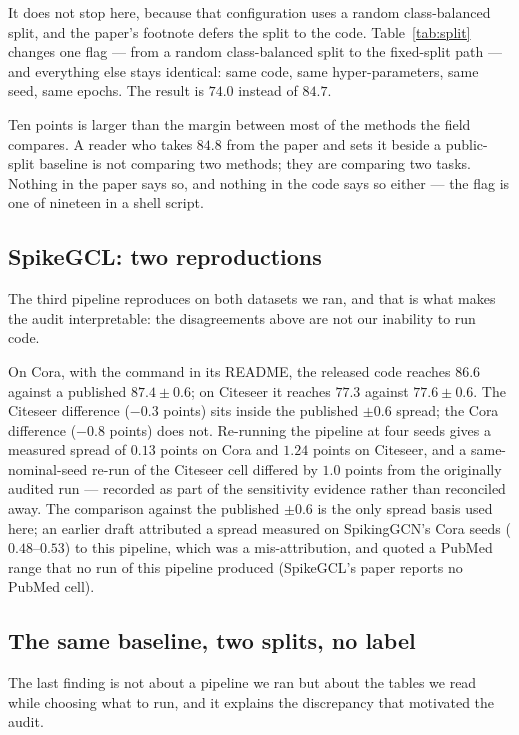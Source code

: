 \documentclass[10pt,twocolumn]{article}
\newcommand{\tabref}[1]{Table~\ref{#1}}
\begin{document}
It does not stop here, because that configuration uses a random class-balanced split, and the paper's
footnote defers the split to the code. \tabref{tab:split} changes one flag --- from a random
class-balanced split to the fixed-split path --- and everything else stays identical: same code, same
hyper-parameters, same seed, same epochs. The result is $74.0$ instead of $84.7$.

Ten points is larger than the margin between most of the methods the field compares. A reader who
takes $84.8$ from the paper and sets it beside a public-split baseline is not comparing two methods;
they are comparing two tasks. Nothing in the paper says so, and nothing in the code says so either
--- the flag is one of nineteen in a shell script.

\subsection{SpikeGCL: two reproductions}
\label{sec:gcl}

The third pipeline reproduces on both datasets we ran, and that is what makes the audit
interpretable: the disagreements above are not our inability to run code.

On Cora, with the command in its README, the released code reaches $86.6$ against a published
$87.4\pm0.6$; on Citeseer it reaches $77.3$ against $77.6\pm0.6$. The Citeseer difference
($-0.3$ points) sits inside the published $\pm 0.6$ spread; the Cora difference ($-0.8$ points)
does not. Re-running the pipeline at four seeds gives a measured spread of $0.13$ points on Cora
and $1.24$ points on Citeseer, and a same-nominal-seed re-run of the Citeseer cell differed by
$1.0$ points from the originally audited run --- recorded as part of the sensitivity evidence
rather than reconciled away. The comparison against the published $\pm 0.6$ is the only spread
basis used here; an earlier draft attributed a spread measured on SpikingGCN's Cora seeds
($0.48$--$0.53$) to this pipeline, which was a mis-attribution, and quoted a PubMed range that no
run of this pipeline produced (SpikeGCL's paper reports no PubMed cell).

\subsection{The same baseline, two splits, no label}
\label{sec:mixed}

The last finding is not about a pipeline we ran but about the tables we read while choosing what to
run, and it explains the discrepancy that motivated the audit.
\end{document}
